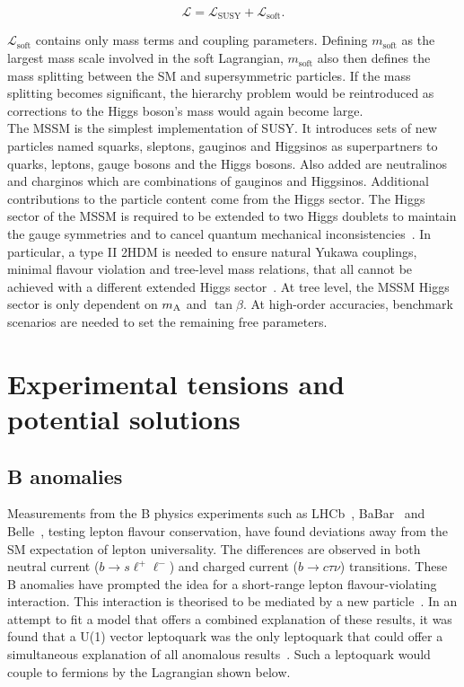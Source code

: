 \begin{equation}
    \mathcal{L} = \mathcal{L}_{\text{SUSY}} + \mathcal{L}_{\text{soft}}.
\end{equation}

$\mathcal{L}_{\text{soft}}$ contains only mass terms and coupling parameters. 
Defining $m_{\text{soft}}$ as the largest mass scale involved in the soft Lagrangian, $m_{\text{soft}}$ also then defines the mass splitting between the \ac{SM} and supersymmetric particles. 
If the mass splitting becomes significant, the hierarchy problem would be reintroduced as corrections to the Higgs boson's mass would again become large. \\

The \ac{MSSM} is the simplest implementation of \ac{SUSY}.
It introduces sets of new particles named squarks, sleptons, gauginos and Higgsinos as superpartners to quarks, leptons, gauge bosons and the Higgs bosons.
Also added are neutralinos and charginos which are combinations of gauginos and Higgsinos.
Additional contributions to the particle content come from the Higgs sector.
The Higgs sector of the \ac{MSSM} is required to be extended to two Higgs doublets to maintain the gauge symmetries and to cancel quantum mechanical inconsistencies~\cite{SUSY_Primer}.
In particular, a type II \ac{2HDM} is needed to ensure natural Yukawa couplings, minimal flavour violation and tree-level mass relations, that all cannot be achieved with a different extended Higgs sector~\cite{SUSY_Primer}.
At tree level, the \ac{MSSM} Higgs sector is only dependent on $m_{{\text{A}}}$ and $\tan\beta$.
At high-order accuracies, benchmark scenarios are needed to set the remaining free parameters.

\section{Experimental tensions and potential solutions}

\subsection{B anomalies}
\label{sec:b_anomalies}

Measurements from the B physics experiments such as LHCb~\cite{LHCb:2021trn,LHCb:2015gmp,LHCb:2017rln,LHCb:2017smo}, BaBar~\cite{Kowalewski:2013mna,BaBar:2013mob} and Belle~\cite{Belle:2015qfa,Belle:2016dyj}, testing lepton flavour conservation, have found deviations away from the \ac{SM} expectation of lepton universality.
The differences are observed in both neutral current ($b\rightarrow s\ell^{+}\ell^{-}$) and charged current ($b\rightarrow c\tau\nu$) transitions.
These B anomalies have prompted the idea for a short-range lepton flavour-violating interaction.
This interaction is theorised to be mediated by a new  particle~\cite{Diaz:2017lit,Schmaltz:2018nls}.
In an attempt to fit a model that offers a combined explanation of these results, it was found that a U(1) vector leptoquark was the only leptoquark that could offer a simultaneous explanation of all anomalous results~\cite{Cornella:2021sby}. 
Such a leptoquark would couple to fermions by the Lagrangian shown below.

